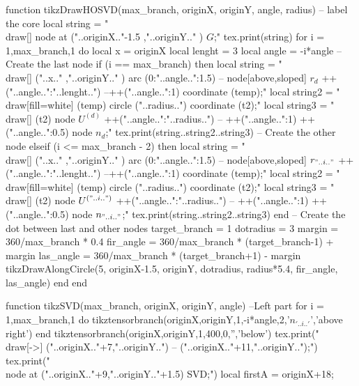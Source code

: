 \begin{luacode*}
function tikzDrawHOSVD(max_branch, originX, originY, angle, radius)
      -- label the core
      local string = "\\draw[] node at ("..originX.."-1.5 ,"..originY.." ) {$G$};"
      tex.print(string)
      for i = 1,max_branch,1 do
      local x = originX
      local lenght = 3
      local angle = -i*angle      
      -- Create the last node
      if (i == max_branch) then
      local string = "\\draw[] ("..x.." ,"..originY.." ) arc (0:"..angle..":1.5) -- node[above,sloped] { $r_{d}$} ++("..angle..":"..lenght..") --++("..angle..":1) coordinate (temp);"
      local string2 = "\\draw[fill=white] (temp) circle ("..radius..")  coordinate (t2);"
      local string3 = "\\draw[] (t2) node {$U^{(d)}$} ++("..angle..":"..radius..") -- ++("..angle..":1) ++("..angle..":0.5) node {$n_{d}$};"
      tex.print(string..string2..string3)
      -- Create the other node
      elseif (i <= max_branch - 2) then
      local string = "\\draw[] ("..x.." ,"..originY.." ) arc (0:"..angle..":1.5) -- node[above,sloped] { $r_{"..i.."}$} ++("..angle..":"..lenght..")  --++("..angle..":1) coordinate (temp);"
      local string2 = "\\draw[fill=white] (temp) circle ("..radius..") coordinate (t2);"
      local string3 = "\\draw[] (t2) node {$U^{("..i..")}$} ++("..angle..":"..radius..") -- ++("..angle..":1) ++("..angle..":0.5) node {$n_{"..i.."}$};"
      tex.print(string..string2..string3)
      end
      -- Create the dot between last and other nodes
      target_branch = 1
      dotradius = 3
      margin = 360/max_branch * 0.4
      fir_angle = 360/max_branch * (target_branch-1) + margin
      las_angle = 360/max_branch * (target_branch+1) - margin
      tikzDrawAlongCircle(5, originX-1.5, originY, dotradius, radius*5.4, fir_angle, las_angle)
      end
    end

    function tikzSVD(max_branch, originX, originY, angle)
    --Left part
          for i = 1,max_branch,1 do
          tikztensorbranch(originX,originY,1,-i*angle,2,'$n_{'..i..'}$','above right')
          end
          tikztensorbranch(originX,originY,1,400,0,'','below')
          tex.print("\\draw[->] ("..originX.."+7,"..originY..") -- ("..originX.."+11,"..originY..");")
          tex.print("\\node at ("..originX.."+9,"..originY.."+1.5) {SVD};")
          local firstA = originX+18;
    

\end{luacode*}
